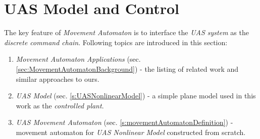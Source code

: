 \cleardoublepage
\section{UAS Model and Control}\label{s:modelMAImplementation}

\noindent The key feature of \emph{Movement Automaton} is to interface the \emph{UAS system} as the \emph{discrete command chain}. Following topics are introduced in this section:

\begin{enumerate}
	\item \emph{Movement Automaton Applications} (sec. \ref{sec:MovementAutomatonBackground}) - the listing of related work and similar approaches to ours.
	
	
    \item \emph{UAS Model} (sec. \ref{s:UASNonlinearModel}) - a simple plane model used in this work as the \emph{controlled plant}.
    
    \item \emph{UAS Movement Automaton} (sec. \ref{s:movementAutomatonDefinition}) - movement automaton for \emph{UAS Nonlinear Model} constructed from scratch.
\end{enumerate}









